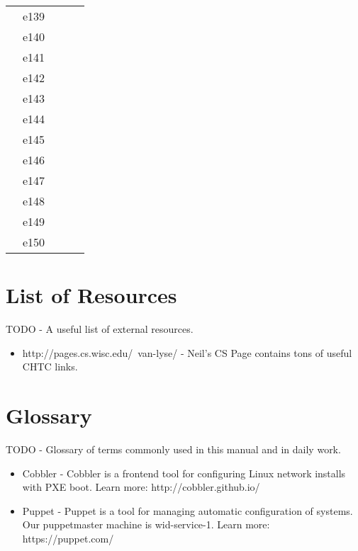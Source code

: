 \documentclass[10pt,letterpaper]{article}
\begin{document}
\begin{center}
\begin{tabular}{ |c|c|c|c|c|}
        & e139  &                &                &      \\
        & e140  &                &                &      \\
        & e141  &                &                &      \\
        & e142  &                &                &      \\
        & e143  &                &                &      \\
        & e144  &                &                &      \\
        & e145  &                &                &      \\
        & e146  &                &                &      \\
        & e147  &                &                &      \\
        & e148  &                &                &      \\
        & e149  &                &                &      \\
        & e150  &                &                &      \\

        \hline
        \end{tabular}
        \end{center}


\clearpage

\section{List of Resources}
    TODO - A useful list of external resources.
    \begin{itemize}
        \item http://pages.cs.wisc.edu/~van-lyse/ - Neil's CS Page contains tons
        of useful CHTC links.
    \end{itemize}
\clearpage

\section{Glossary}
    TODO - Glossary of terms commonly used in this manual and in daily work.
    \begin{itemize}
        \item Cobbler - Cobbler is a frontend tool for configuring Linux network
        installs with PXE boot. Learn more: http://cobbler.github.io/
        \item Puppet - Puppet is a tool for managing automatic configuration of
        systems. Our puppetmaster machine is wid-service-1. Learn more:
        https://puppet.com/
    \end{itemize}
\clearpage
\end{document}
